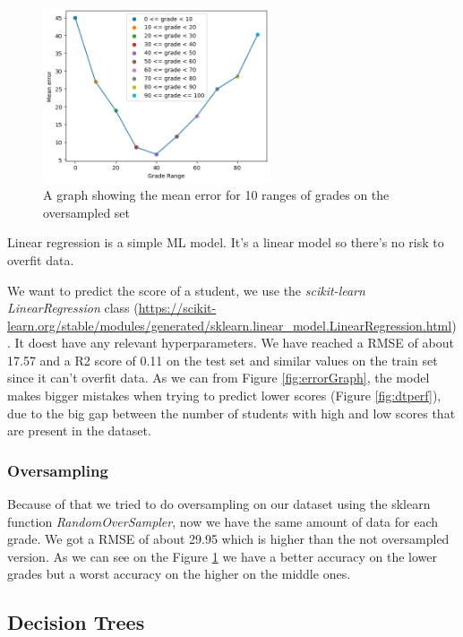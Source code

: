 \documentclass{article}
\begin{document}
\begin{figure}[h]
    \centering
    \includegraphics[width=0.6\textwidth]{grades_errors2.png}
    \caption{A graph showing the mean error for 10 ranges of grades on the oversampled set}
    \label{fig:errorGraph2}
\end{figure}

Linear regression is a simple ML model. It's a linear model so there's no risk to overfit data.

We want to predict the score of a student, we use the \textit{scikit-learn LinearRegression} class (\url{https://scikit-learn.org/stable/modules/generated/sklearn.linear_model.LinearRegression.html}). It doest have any relevant hyperparameters.
We have reached a RMSE of about 17.57 and a R2 score of 0.11 on the test set and similar values on the train set since it can't overfit data.
As we can from Figure \ref{fig:errorGraph}, the model makes bigger mistakes when trying to predict lower scores (Figure \ref{fig:dtperf}), due to the big gap between the number of students with high and low scores that are present in the dataset. 

\subsubsection{Oversampling}
Because of that we tried to do oversampling on our dataset using the sklearn function \textit{RandomOverSampler}, now we have the same amount of data for each grade. 
We got a RMSE of about 29.95 which is higher than the not oversampled version. As we can see on the Figure \ref{fig:errorGraph2} we have a better accuracy on the lower grades but a worst accuracy on the higher on the middle ones.






\subsection{Decision Trees}
\end{document}
